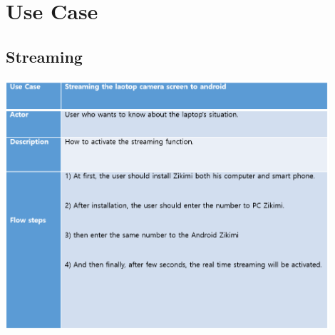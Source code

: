 \documentclass[12pt]{article}
\begin{document}

\newpage\section{Use Case}
\subsection{Streaming}
\begin{center} 
\includegraphics[width=120mm,scale=1.8]{streaming}
\end{center}
\end{document}
